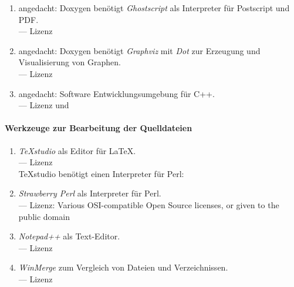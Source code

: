 \begin{enumerate}
	\item\label{Werkzeug:Ghostscript}angedacht: Doxygen benötigt \emph{Ghostscript} als Interpreter für Postscript und PDF.
	\\
	--- Lizenz 

	\item\label{Werkzeug:Graphviz}angedacht: Doxygen benötigt \emph{Graphviz} mit \emph{Dot} zur Erzeugung und Visualisierung von Graphen.
	\\
	--- Lizenz 

	\item\label{Werkzeug:Qt}angedacht: Software Entwicklungsumgebung für C++.
	\\
--- Lizenz  und 

	\setcounter{Enumi}{\value{enumi}}%
\end{enumerate}

\paragraph{Werkzeuge zur Bearbeitung der Quelldateien}%

\begin{enumerate}
	\setcounter{enumi}{\value{Enumi}}%

	\item\label{Werkzeug:TeXstudio}\emph{\TeX studio} als Editor für \LaTeX.
	\\
	--- Lizenz 
	\\\TeX studio benötigt einen Interpreter für Perl:

	\item\label{Werkzeug:Perl}\emph{Strawberry Perl} als Interpreter für Perl.
	\\
	--- Lizenz: Various OSI-compatible Open Source licenses, or given to the public domain

	\item\label{Werkzeug:Notepadpp}\emph{Notepad++} als Text-Editor.
	\\
	--- Lizenz 

	\item\label{Werkzeug:WinMerge}\emph{WinMerge} zum Vergleich von Dateien und Verzeichnissen.
	\\
	--- Lizenz 

	\setcounter{Enumi}{\value{enumi}}%
\end{enumerate}

